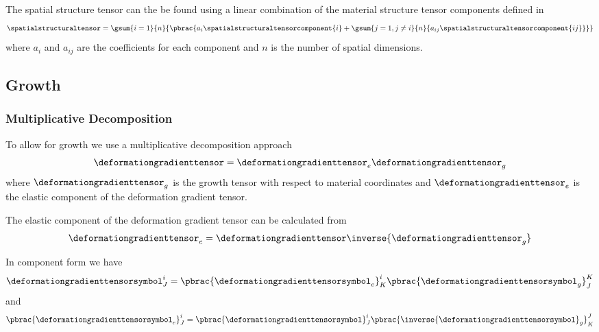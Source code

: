 The spatial structure tensor can the be found using a linear
combination of the material structure tensor components defined in
 \ie
\begin{equation}
  \spatialstructuraltensor=\gsum{i=1}{n}{\pbrac{a_{i}\spatialstructuraltensorcomponent{i}
      +\gsum{j=1,j\neq i}{n}{a_{ij}\spatialstructuraltensorcomponent{ij}}}}
  \label{eqn:SpatialStructuralTensorDefinition}
\end{equation}
where $a_{i}$ and $a_{ij}$ are the coefficients for each component and
$n$ is the number of spatial dimensions.

\subsection{Growth}
\label{subsec:FiniteElasticityGrowth}

\subsubsection{Multiplicative Decomposition}
\label{subsubsec:FiniteElasticityGrowthMultiplicativeDecomposition}

To allow for growth we use a multiplicative decomposition approach \ie
\begin{equation}
  \deformationgradienttensor=\deformationgradienttensor_{e}\deformationgradienttensor_{g}
\end{equation}
where $\deformationgradienttensor_{g}$ is the growth tensor
with respect to material coordinates and
$\deformationgradienttensor_{e}$ is the elastic component of
the deformation gradient tensor.

The elastic component of the deformation gradient tensor can be calculated
from
\begin{equation}
  \deformationgradienttensor_{e}=\deformationgradienttensor\inverse{\deformationgradienttensor_{g}}
\end{equation}

In component form we have
\begin{equation}
  \deformationgradienttensorsymbol^{i}_{J}=\pbrac{\deformationgradienttensorsymbol_{e}}^{i}_{K}
  \pbrac{\deformationgradienttensorsymbol_{g}}^{K}_{J}
\end{equation}
and
\begin{equation}
  \pbrac{\deformationgradienttensorsymbol_{e}}^{i}_{J}=\pbrac{\deformationgradienttensorsymbol}^{i}_{J}
  \pbrac{\inverse{\deformationgradienttensorsymbol}_{g}}^{J}_{K}
\end{equation}

